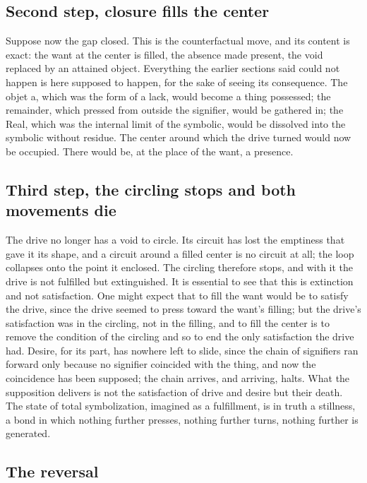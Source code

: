 \subsection*{Second step, closure fills the center}

Suppose now the gap closed. This is the counterfactual move, and its content is exact: the want at the center is filled, the absence made present, the void replaced by an attained object. Everything the earlier sections said could not happen is here supposed to happen, for the sake of seeing its consequence. The objet a, which was the form of a lack, would become a thing possessed; the remainder, which pressed from outside the signifier, would be gathered in; the Real, which was the internal limit of the symbolic, would be dissolved into the symbolic without residue. The center around which the drive turned would now be occupied. There would be, at the place of the want, a presence.

\subsection*{Third step, the circling stops and both movements die}

The drive no longer has a void to circle. Its circuit has lost the emptiness that gave it its shape, and a circuit around a filled center is no circuit at all; the loop collapses onto the point it enclosed. The circling therefore stops, and with it the drive is not fulfilled but extinguished. It is essential to see that this is extinction and not satisfaction. One might expect that to fill the want would be to satisfy the drive, since the drive seemed to press toward the want's filling; but the drive's satisfaction was in the circling, not in the filling, and to fill the center is to remove the condition of the circling and so to end the only satisfaction the drive had. Desire, for its part, has nowhere left to slide, since the chain of signifiers ran forward only because no signifier coincided with the thing, and now the coincidence has been supposed; the chain arrives, and arriving, halts. What the supposition delivers is not the satisfaction of drive and desire but their death. The state of total symbolization, imagined as a fulfillment, is in truth a stillness, a bond in which nothing further presses, nothing further turns, nothing further is generated.

\subsection*{The reversal}

